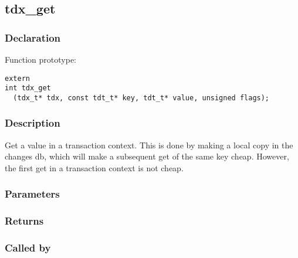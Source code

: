 
\newpage
\subsection{tdx\_get}
\subsubsection{Declaration} Function prototype:

\begin{verbatim}
extern
int tdx_get
  (tdx_t* tdx, const tdt_t* key, tdt_t* value, unsigned flags);
\end{verbatim}

\subsubsection{Description}


 Get a value in a transaction context.
 This is done by making a local copy in the changes db, which will
 make a subsequent get of the same key cheap. However, the first
 get in a transaction context is not cheap.
 

\subsubsection{Parameters}
\subsubsection{Returns}
\subsubsection{Called by}

